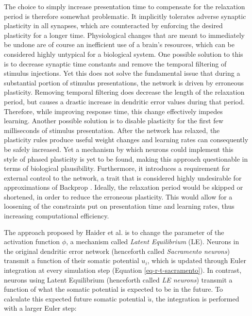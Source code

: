 The choice to simply increase presentation time to compensate for the relaxation period is therefore somewhat
problematic. It implicitly tolerates adverse synaptic plasticity in all synapses, which are counteracted by enforcing
the desired plasticity for a longer time. Physiological changes that are meant to immediately be undone are of course an
inefficient use of a brain's resources, which can be considered highly untypical for a biological system. One possible
solution to this is to decrease synaptic time constants and remove the temporal filtering of stimulus injections. Yet
this does not solve the fundamental issue that during a substantial portion of stimulus presentations, the network is
driven by erroneous plasticity. Removing temporal filtering does decrease the length of the relaxation period, but
causes a drastic increase in dendritic error values during that period. Therefore, while improving response time, this
change effectively impedes learning. Another possible solution is to disable plasticity for the first few milliseconds
of stimulus presentation. After the network has relaxed, the plasticity rules produce useful weight changes and learning
rates can consequently be safely increased. Yet a mechanism by which neurons could implement this style of phased
plasticity is yet to be found, making this approach questionable in terms of biological plausibility. Furthermore, it
introduces a requirement for external control to the network, a trait that is considered highly undesirable for
approximations of Backprop \citep{whittington2019theories}. Ideally, the relaxation period would be skipped or
shortened, in order to reduce the erroneous plasticity. This would allow for a loosening of the constraints put on
presentation time and learning rates, thus increasing computational efficiency. \newline



The approach proposed by Haider et al. is to change the parameter of the activation function $\phi$, a mechanism called
\textit{Latent Equilibrium} (LE). Neurons in the original dendritic error network (henceforth called \textit{Sacramento
  neurons}) transmit a function of their somatic potential $u_i$, which is updated through Euler integration at every
simulation step (Equation \ref{eq-r-t-sacramento}). In contrast, neurons using Latent Equilibrium (henceforth called
\textit{LE neurons}) transmit a function of what the somatic potential is expected to be in the future. To calculate
this expected future somatic potential $\breve{u}$, the integration is performed with a larger Euler step:

